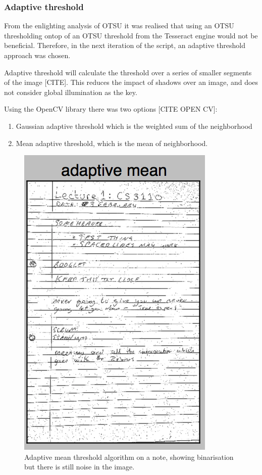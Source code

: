 \subsubsection{Adaptive threshold} \label{section:threshold}
From the enlighting analysis of OTSU it was realised that using an OTSU thresholding ontop of an OTSU threshold from the Tesseract engine would not be beneficial. Therefore, in the next iteration of the script, an adaptive threshold approach was chosen.

Adaptive threshold will calculate the threshold over a series of smaller segments of the image [CITE]. This reduces the impact of shadows over an image, and does not consider global illumination as the key.

Using the OpenCV library there was two options [CITE OPEN CV]:
\begin{enumerate}
  \item Gaussian adaptive threshold which is the weighted sum of the neighborhood
  \item Mean adaptive threshold, which is the mean of neighborhood.
\end{enumerate}

\begin{figure}[H]
  \centering
  \includegraphics{images/adaptive_mean}
  \caption{Adaptive mean threshold algorithm on a note, showing binarisation but there is still noise in the image.}
  \label{fig:adaptive_mean}
\end{figure}

